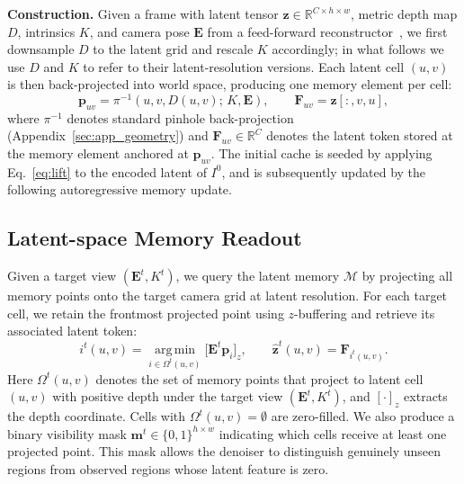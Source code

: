 \documentclass{llmxive}
\providecommand{\boldstart}[1]{\vspace{0.1in}\noindent\textbf{#1}}
\begin{document}
\boldstart{Construction.}
Given a frame with latent tensor $\mathbf{z} \in \mathbb{R}^{C \times h \times w}$,
metric depth map $D$, intrinsics $K$, and camera pose $\mathbf{E}$
from a feed-forward reconstructor~\cite{lin2025depth}, we first
downsample $D$ to the latent grid and rescale $K$ accordingly; in what
follows we use $D$ and $K$ to refer to their latent-resolution versions.
Each latent cell $(u,v)$ is then back-projected into world space,
producing one memory element per cell:
\begin{equation}
\mathbf{p}_{uv} = \pi^{-1}(u, v, D(u,v);\, K, \mathbf{E}), \qquad \mathbf{F}_{uv} = \mathbf{z}[:, v, u],
\label{eq:lift}
\end{equation}
where $\pi^{-1}$ denotes standard pinhole back-projection
(Appendix~\ref{sec:app_geometry}) and $\mathbf{F}_{uv}\in \mathbb{R}^C$ denotes the latent token stored at the memory element anchored at $\mathbf{p}_{uv}$.
The initial cache is seeded by applying Eq.~\ref{eq:lift} to the
encoded latent of $I^0$, and is subsequently updated by the following autoregressive memory update.





\subsection{Latent-space Memory Readout}
\label{sec:method:read}

 Given a target view $(\mathbf{E}^t, K^t)$, we query the latent memory
$\mathcal{M}$ by projecting all memory points onto the target camera grid
at latent resolution. For each target cell, we retain the frontmost
projected point using $z$-buffering and retrieve its associated latent
token:
\begin{equation}
i^t(u,v)
=
\operatorname*{arg\,min}_{i \in \Omega^t(u,v)}
\bigl[\mathbf{E}^t \mathbf{p}_i\bigr]_z,
\qquad
\hat{\mathbf{z}}^t(u,v)
=
\mathbf{F}_{i^t(u,v)} .
\label{eq:read}
\end{equation}
Here $\Omega^t(u,v)$ denotes the set of memory points that project to
latent cell $(u,v)$ with positive depth under the target view
$(\mathbf{E}^t,K^t)$, and $[\cdot]_z$ extracts the depth coordinate.
Cells with $\Omega^t(u,v)=\emptyset$ are zero-filled. We also produce a
binary visibility mask $\mathbf{m}^t\in\{0,1\}^{h\times w}$ indicating
which cells receive at least one projected point. This mask allows the
denoiser to distinguish genuinely unseen regions from observed regions
whose latent feature is zero. 
\end{document}
